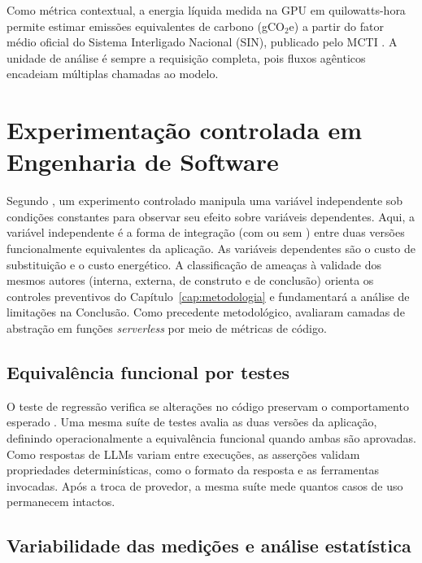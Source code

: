 Como métrica contextual, a energia líquida medida na GPU em quilowatts-hora
permite estimar emissões equivalentes de carbono (gCO$_2$e) a partir do fator
médio oficial do Sistema Interligado Nacional (SIN), publicado pelo
MCTI \cite{luccioni2024,mcti_sirene}. A unidade de análise é sempre a requisição
completa, pois fluxos agênticos encadeiam múltiplas chamadas ao modelo.

\section{Experimentação controlada em Engenharia de Software}
\label{sec:experimentacao}

Segundo , um experimento controlado manipula uma variável
independente sob condições constantes para observar seu efeito sobre variáveis
dependentes. Aqui, a variável independente é a forma de integração (com ou sem
\harness{}) entre duas versões funcionalmente equivalentes da aplicação. As
variáveis dependentes são o custo de substituição e o custo energético. A
classificação de ameaças à validade dos mesmos autores (interna, externa, de
construto e de conclusão) orienta os controles preventivos do
Capítulo~\ref{cap:metodologia} e fundamentará a análise de limitações na
Conclusão. Como precedente metodológico,  avaliaram camadas de
abstração em funções \textit{serverless} por meio de métricas de código.

\subsection{Equivalência funcional por testes}
\label{subsec:exp-equivalencia}

O teste de regressão verifica se alterações no código preservam o comportamento
esperado \cite{yoo2012}. Uma mesma suíte de testes avalia as duas versões da
aplicação, definindo operacionalmente a equivalência funcional quando ambas são
aprovadas. Como respostas de LLMs variam entre execuções, as asserções validam
propriedades determinísticas, como o formato da resposta e as ferramentas
invocadas. Após a troca de provedor, a mesma suíte mede quantos casos de uso
permanecem intactos.

\subsection{Variabilidade das medições e análise estatística}
\label{subsec:exp-estatistica}

